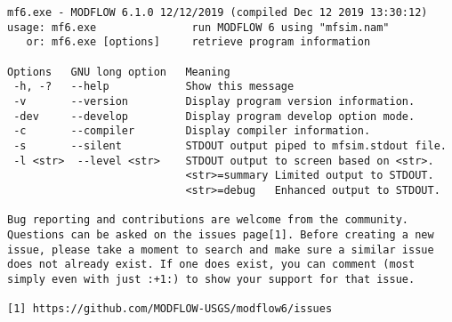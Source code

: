 {\small
\begin{lstlisting}[style=modeloutput]
mf6.exe - MODFLOW 6.1.0 12/12/2019 (compiled Dec 12 2019 13:30:12)
usage: mf6.exe               run MODFLOW 6 using "mfsim.nam"
   or: mf6.exe [options]     retrieve program information

Options   GNU long option   Meaning
 -h, -?   --help            Show this message
 -v       --version         Display program version information.
 -dev     --develop         Display program develop option mode.
 -c       --compiler        Display compiler information.
 -s       --silent          STDOUT output piped to mfsim.stdout file.
 -l <str>  --level <str>    STDOUT output to screen based on <str>.
                            <str>=summary Limited output to STDOUT.
                            <str>=debug   Enhanced output to STDOUT.

Bug reporting and contributions are welcome from the community.
Questions can be asked on the issues page[1]. Before creating a new
issue, please take a moment to search and make sure a similar issue
does not already exist. If one does exist, you can comment (most
simply even with just :+1:) to show your support for that issue.

[1] https://github.com/MODFLOW-USGS/modflow6/issues


\end{lstlisting}
}
